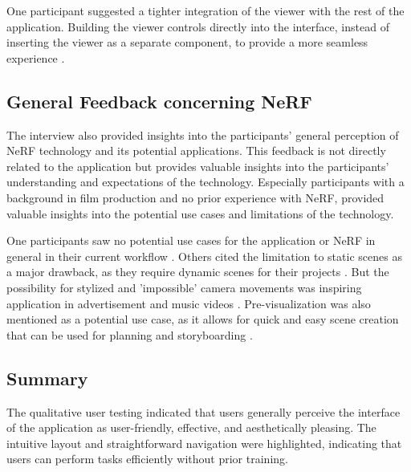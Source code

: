 One participant suggested a tighter integration of the viewer with the rest of the application.
Building the viewer controls directly into the interface, instead of inserting the viewer as a separate component, to provide a more seamless experience \cite{P9}.

\subsection*{General Feedback concerning NeRF}

The interview also provided insights into the participants' general perception of NeRF technology and its potential applications.
This feedback is not directly related to the application but provides valuable insights into the participants' understanding and expectations of the technology.
Especially participants with a background in film production and no prior experience with NeRF, provided valuable insights into the potential use cases and limitations of the technology.

One participants saw no potential use cases for the application or NeRF in general in their current workflow \cite{P3}. 
Others cited the limitation to static scenes as a major drawback, as they require dynamic scenes for their projects \cite{P4, P5}. 
But the possibility for stylized and 'impossible' camera movements was inspiring application in advertisement and music videos \cite{P4}. 
Pre-visualization was also mentioned as a potential use case, as it allows for quick and easy scene creation that can be used for planning and storyboarding \cite{P4}. 


\subsection*{Summary}
\label{sec:result:qualitative_summary}

The qualitative user testing indicated that users generally perceive the interface of the application as user-friendly, effective, and aesthetically pleasing.
The intuitive layout and straightforward navigation were highlighted, indicating that users can perform tasks efficiently without prior training.

